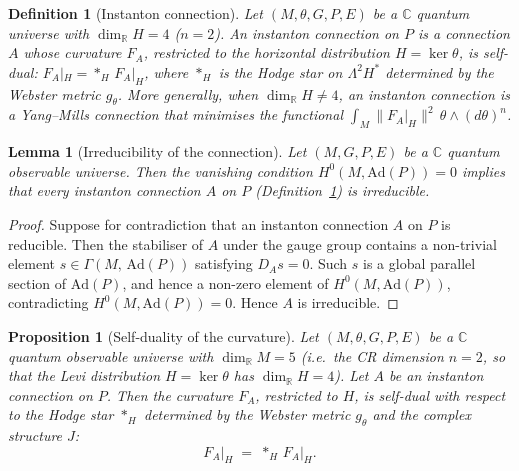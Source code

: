 \documentclass[12pt,a4paper]{report}
\newtheorem{lemma}[theorem]{Lemma}
\newtheorem{proposition}[theorem]{Proposition}
\newtheorem{definition}[theorem]{Definition}
\begin{document}
\begin{definition}[Instanton connection]
\label{def:instanton}
Let $(M, \theta, G, P, E)$ be a $\mathbb{C}$ quantum universe with
$\dim_{\mathbb{R}} H = 4$ ($n = 2$).  An \emph{instanton connection} on $P$
is a connection $A$ whose curvature $F_A$, restricted to the horizontal
distribution $H = \ker\theta$, is self-dual:
$F_A|_H = {*_H}\,F_A|_H$, where $*_H$ is the Hodge star on
$\Lambda^2 H^*$ determined by the Webster metric $g_\theta$.  More generally,
when $\dim_{\mathbb{R}} H \neq 4$, an instanton connection is a
Yang--Mills connection that minimises the functional
$\int_M \lVert F_A|_H \rVert^2\,\theta \wedge (d\theta)^n$.
\end{definition}

\begin{lemma}[Irreducibility of the connection]
\label{lem:irreducible-connection}
Let $(M, G, P, E)$ be a $\mathbb{C}$ quantum observable universe.  Then the
vanishing condition $H^0(M, \mathrm{Ad}(P)) = 0$ implies that every
instanton connection $A$ on $P$ (Definition~\ref{def:instanton}) is
irreducible.
\end{lemma}

\begin{proof}
Suppose for contradiction that an instanton connection $A$ on $P$ is
reducible.  Then the stabiliser of $A$ under the gauge group contains a
non-trivial element $s \in \Gamma(M,\, \mathrm{Ad}(P))$ satisfying
$D_A s = 0$.  Such $s$ is a global parallel section of $\mathrm{Ad}(P)$,
and hence a non-zero element of $H^0(M, \mathrm{Ad}(P))$, contradicting
$H^0(M, \mathrm{Ad}(P)) = 0$.  Hence $A$ is irreducible.
\end{proof}

\begin{proposition}[Self-duality of the curvature]
\label{prop:self-dual-curvature}
Let $(M, \theta, G, P, E)$ be a $\mathbb{C}$ quantum observable universe
with $\dim_{\mathbb{R}} M = 5$ (i.e.\ the CR dimension $n = 2$, so that the
Levi distribution $H = \ker\theta$ has $\dim_{\mathbb{R}} H = 4$).  Let $A$
be an instanton connection on $P$.  Then the curvature $F_A$, restricted to
$H$, is self-dual with respect to the Hodge star $*_H$ determined by the
Webster metric $g_\theta$ and the complex structure $J$:
\[
  F_A\big|_H \;=\; {*_H}\, F_A\big|_H.
\]
\end{proposition}
\end{document}
